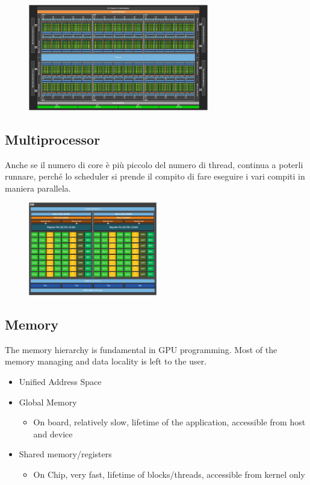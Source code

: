 \begin{figure}[ht]
	\centering
	\includegraphics[width=0.7\textwidth]{figure_parallel/gpu_structure.png}
\end{figure}
\FloatBarrier

\subsection{Multiprocessor}
Anche se il numero di core è più piccolo del numero di thread, continua a poterli runnare, perché lo scheduler si prende il compito di fare eseguire i vari compiti in maniera parallela.

\begin{figure}[ht]
	\centering
	\includegraphics[width=0.5\textwidth]{figure_parallel/multiprocessor.png}
\end{figure}
\FloatBarrier

\subsection{Memory}

The memory hierarchy is fundamental in GPU programming.
Most of the memory managing and data locality is left to the user.\\
\begin{itemize}
	\item Unified Address Space
	\item Global Memory
	\begin{itemize}
		\item On board, relatively slow, lifetime of the application, accessible from host and device 
	\end{itemize}
	\item Shared memory/registers
		\begin{itemize}
		\item On Chip, very fast, lifetime of blocks/threads, accessible from kernel only
	\end{itemize}
\end{itemize}



